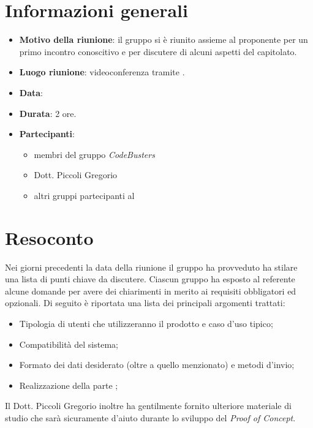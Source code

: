 \section{Informazioni generali}
\begin{itemize}
\item \textbf{Motivo della riunione}: il gruppo si è riunito assieme al proponente per un primo incontro conoscitivo e per discutere di alcuni aspetti del capitolato.
\item \textbf{Luogo riunione}: videoconferenza tramite .
\item \textbf{Data}: \Data{}
\item \textbf{Durata}: 2 ore.
\item \textbf{Partecipanti}:
	\begin{itemize}
	\item membri del gruppo \textit{CodeBusters}
	\item Dott. Piccoli Gregorio
	\item altri gruppi partecipanti al 
	\end{itemize}
\end{itemize}

\section{Resoconto}
Nei giorni precedenti la data della riunione il gruppo ha provveduto ha stilare una lista di punti chiave da discutere. Ciascun gruppo ha esposto al referente alcune domande per avere dei chiarimenti in merito ai requisiti obbligatori ed opzionali. Di seguito è riportata una lista dei principali argomenti trattati:
\begin{itemize}

\item Tipologia di utenti che utilizzeranno il prodotto e caso d'uso tipico;

\item Compatibilità del sistema;

\item Formato dei dati desiderato (oltre a quello menzionato) e metodi d'invio;

\item Realizzazione della parte ;

\end{itemize}

Il Dott. Piccoli Gregorio inoltre ha gentilmente fornito ulteriore materiale di studio che sarà sicuramente d'aiuto durante lo sviluppo del \textit{Proof of Concept}.